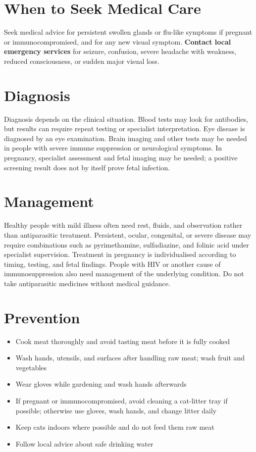 \section*{When to Seek Medical Care}
Seek medical advice for persistent swollen glands or flu-like symptoms if pregnant or immunocompromised, and for any new visual symptom. \textbf{Contact local emergency services} for seizure, confusion, severe headache with weakness, reduced consciousness, or sudden major visual loss.

\section*{Diagnosis}
Diagnosis depends on the clinical situation. Blood tests may look for antibodies, but results can require repeat testing or specialist interpretation. Eye disease is diagnosed by an eye examination. Brain imaging and other tests may be needed in people with severe immune suppression or neurological symptoms. In pregnancy, specialist assessment and fetal imaging may be needed; a positive screening result does not by itself prove fetal infection.

\section*{Management}
Healthy people with mild illness often need rest, fluids, and observation rather than antiparasitic treatment. Persistent, ocular, congenital, or severe disease may require combinations such as pyrimethamine, sulfadiazine, and folinic acid under specialist supervision. Treatment in pregnancy is individualised according to timing, testing, and fetal findings. People with HIV or another cause of immunosuppression also need management of the underlying condition. Do not take antiparasitic medicines without medical guidance.

\section*{Prevention}
\begin{itemize}
    \item Cook meat thoroughly and avoid tasting meat before it is fully cooked
    \item Wash hands, utensils, and surfaces after handling raw meat; wash fruit and vegetables
    \item Wear gloves while gardening and wash hands afterwards
    \item If pregnant or immunocompromised, avoid cleaning a cat-litter tray if possible; otherwise use gloves, wash hands, and change litter daily
    \item Keep cats indoors where possible and do not feed them raw meat
    \item Follow local advice about safe drinking water
\end{itemize}


